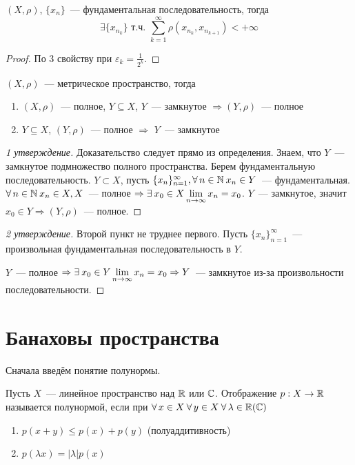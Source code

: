 \documentclass[document]{subfiles}
\begin{document}
\begin{corollary}
\label{cor:subseq-metric-sum-converges}
    $(X, \rho)$, $\{x_n\}$~--- фундаментальная последовательность, тогда 
    \[ \exists \{x_{n_k} \} \text { т.ч. } \sum_{k=1}^\infty \rho(x_{n_k}, x_{n_{k+1}}) < + \infty \]
\end{corollary}
\begin{proof}
    По 3 свойству при $\varepsilon_k = \frac{1}{2^k}$.
\end{proof}

\begin{theorem}
    $(X,\rho)$~--- метрическое пространство, тогда
    \begin{enumerate}
        \item $(X, \rho)$~--- полное, $Y \subseteq X$, $Y$~--- замкнутое $\Rightarrow (Y, \rho)$~--- полное
        \item $Y \subseteq X$, $(Y,\rho)$~--- полное $\Rightarrow$ $Y$~--- замкнутое
    \end{enumerate}
\end{theorem}

\begin{proof}[1 утверждение]
        Доказательство следует прямо из определения. Знаем, что $Y$~--- замкнутое подмножество полного пространства.
        Берем фундаментальную последовательность. $Y \subset X$, пусть $\{x_n\}^\infty_{n=1}, \forall n \in \bN \: x_n \in Y$~--- фундаментальная.
        $\forall n \in \bN \: x_n \in X, X$~--- полное $\Rightarrow \exists x_0 \in X \liml_{n \to \infty} x_n = x_0$. $Y$~--- замкнутое, значит $x_0 \in Y \Rightarrow (Y, \rho)$~--- полное.
\end{proof}
\begin{proof}[2 утверждение]
        Второй пункт не труднее первого. Пусть $\{x_n\}^\infty_{n=1}$~--- произвольная фундаментальная последовательность в $Y$.

        $Y$~--- полное $\Rightarrow \exists x_0 \in Y \liml_{n \to \infty} x_n = x_0 \Rightarrow Y$~--- замкнутое из-за произвольности последовательности.
\end{proof}

\section{Банаховы пространства}

Сначала введём понятие полунормы.
\begin{definition}[полунорма]
    Пусть $X$~--- линейное пространство над $\mathbb{R}$ или $\mathbb{C}$. Отображение $p: X \rightarrow \mathbb{R}$ называется полунормой, если при $\forall x \in X \: \forall y \in X \: \forall \lambda \in \bR (\bC)$
    \begin{enumerate}
        \item $p(x + y) \leq p(x) + p(y)$ (полуаддитивность)
        \item $p(\lambda x) = |\lambda| p(x)$
    \end{enumerate} 
\end{definition}
\end{document}
